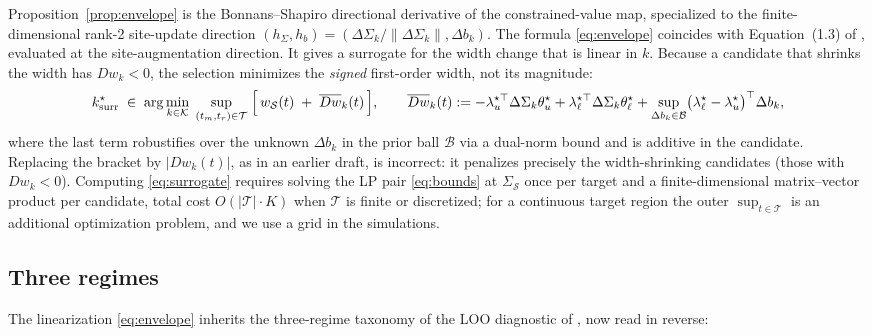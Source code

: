 Proposition~\ref{prop:envelope} is the Bonnans--Shapiro directional derivative of
the constrained-value map, specialized to the finite-dimensional rank-2
site-update direction $(h_\Sigma, h_b) = (\Delta\Sigma_k/\|\Delta\Sigma_k\|,
\Delta b_k)$. The formula \eqref{eq:envelope} coincides with Equation~(1.3) of \citet{boyarsky2026}, evaluated at the site-augmentation direction. It gives a surrogate for the width change that is linear in $k$. Because a
candidate that shrinks the width has $D w_k<0$, the selection minimizes the
\emph{signed} first-order width, not its magnitude:
\begin{equation}
\label{eq:surrogate}
k^\star_{\rm surr}\;\in\;\arg\min_{k\in\mathcal{K}}\;
 \sup_{(t_m,t_r)\in\mathcal{T}}\;
 \Bigl[\,w_\mathcal{S}(t)\;+\;\overline{Dw}_k(t)\,\Bigr],
\qquad
\overline{Dw}_k(t):=
 -\lambda_u^{\star\top}\Delta\Sigma_k\theta_u^\star
 +\lambda_\ell^{\star\top}\Delta\Sigma_k\theta_\ell^\star
 +\sup_{\Delta b_k\in\mathcal{B}}\bigl(\lambda_\ell^\star-\lambda_u^\star\bigr)^\top\Delta b_k,
\end{equation}
where the last term robustifies over the unknown $\Delta b_k$ in the prior ball
$\mathcal{B}$ via a dual-norm bound and is additive in the candidate. Replacing
the bracket by $\bigl|D w_k(t)\bigr|$, as in an earlier draft, is incorrect: it
penalizes precisely the width-shrinking candidates (those with $D w_k<0$).
Computing \eqref{eq:surrogate} requires solving the LP pair \eqref{eq:bounds} at
$\Sigma_\mathcal{S}$ once per target and a finite-dimensional matrix--vector
product per candidate, total cost $O(|\mathcal{T}|\cdot K)$ when $\mathcal{T}$
is finite or discretized; for a continuous target region the outer
$\sup_{t\in\mathcal{T}}$ is an additional optimization problem, and we use a
grid in the simulations.

\subsection{Three regimes}
\label{sec:regimes}

The linearization \eqref{eq:envelope} inherits the three-regime taxonomy of the
LOO diagnostic of \citet[\S4.4]{boyarsky2026}, now read in reverse:

